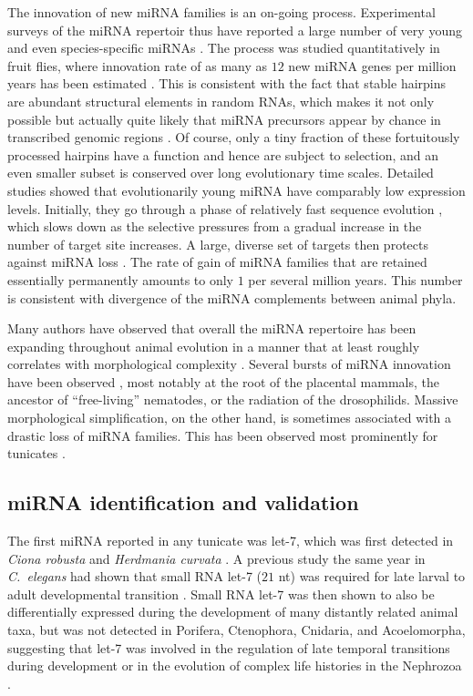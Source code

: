\documentclass[graybox]{svmult}
\begin{document}
The innovation of new miRNA families is an on-going process. Experimental
surveys of the miRNA repertoir thus have reported a large number of very
young and even species-specific miRNAs \citep{Bentwich:05, Berezikov:06}. The
process was studied quantitatively in fruit flies, where innovation rate of
as many as $12$ new miRNA genes per million years has been estimated
\citep{Lu:08}. This is consistent with the fact that stable hairpins are
abundant structural elements in random RNAs, which makes it not only
possible but actually quite likely that miRNA precursors appear by chance
in transcribed genomic regions \citep{Tanzer:04a, CampoPaysaa:11, Marco:13}.
Of course, only a tiny fraction of these fortuitously processed hairpins
have a function and hence are subject to selection, and an even smaller
subset is conserved over long evolutionary time scales. Detailed studies
showed that evolutionarily young miRNA have comparably low expression
levels. Initially, they go through a phase of relatively fast sequence
evolution \citep{Liang:09, Meunier:12}, which slows down as the selective
pressures from a gradual increase in the number of target site increases. A
large, diverse set of targets then protects against miRNA loss
\citep{Lee:07a}. The rate of gain of miRNA families that are retained
essentially permanently amounts to only $1$ per several million years. This
number is consistent with divergence of the miRNA complements between
animal phyla.

Many authors have observed that overall the miRNA repertoire has been
expanding throughout animal evolution in a manner that at least roughly
correlates with morphological complexity \citep{Hertel:06a, Sempere:06,
  Niwa:07, Prochnik:07, Lee:07a, Heimberg:08, Peterson:09,
  Berezikov:11}. Several bursts of miRNA innovation have been observed
\citep{Hertel:06a, Heimberg:08, Tanzer:10a, Hertel:15a}, most notably at the
root of the placental mammals, the ancestor of ``free-living'' nematodes,
or the radiation of the drosophilids.  Massive morphological
simplification, on the other hand, is sometimes associated with a drastic
loss of miRNA families. This has been observed most prominently for
tunicates \citep{Fu:08, Dai:09}.

\subsection{miRNA identification and validation}

The first miRNA reported in any tunicate was let-7, which was 
first detected in \textit{Ciona robusta} and \textit{Herdmania curvata} 
\citep{Pasquinelli2000}. A previous study the same year in \textit{C.\ elegans} 
had shown that small RNA let-7 ($21$ nt) was required for late larval to adult 
developmental transition \citep{Reinhart:2000mz}. Small RNA let-7 was then shown 
to also be differentially expressed during the development of many distantly 
related animal taxa, but was not detected in Porifera, Ctenophora, Cnidaria, 
and Acoelomorpha, suggesting that let-7 was involved in the regulation of late 
temporal transitions during development or in the evolution of complex life 
histories in the Nephrozoa \citep{Pasquinelli2000,Pasquinelli2003}.
\end{document}
